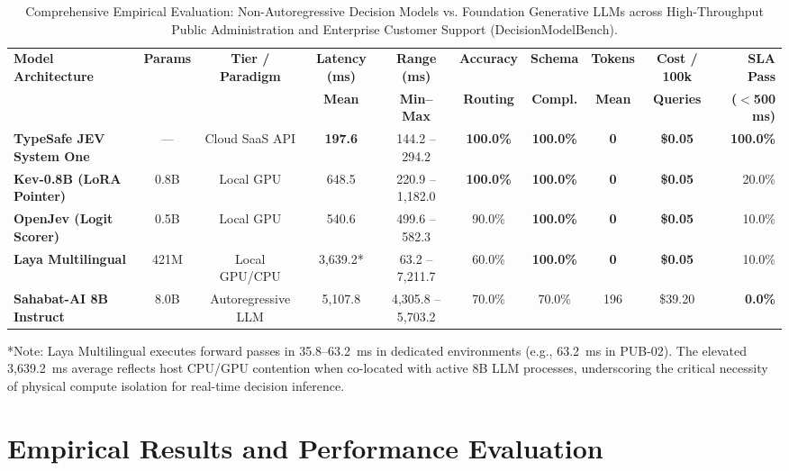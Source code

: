 \documentclass[journal,compsoc]{IEEEtran}
\begin{document}
\begin{table}[t]
\caption{Comprehensive Empirical Evaluation: Non-Autoregressive Decision Models vs. Foundation Generative LLMs across High-Throughput Public Administration and Enterprise Customer Support (DecisionModelBench).}
\label{tab:empirical_results}
\centering
\footnotesize
\setlength{\tabcolsep}{2.5pt}
\begin{tabular*}{\textwidth}{@{\extracolsep{\fill}}lccccccccr@{}}
\toprule
\textbf{Model Architecture} & \textbf{Params} & \textbf{Tier / Paradigm} & \textbf{Latency (ms)} & \textbf{Range (ms)} & \textbf{Accuracy} & \textbf{Schema} & \textbf{Tokens} & \textbf{Cost / 100k} & \textbf{SLA Pass} \\
 & & & \textbf{Mean} & \textbf{Min--Max} & \textbf{Routing} & \textbf{Compl.} & \textbf{Mean} & \textbf{Queries} & \textbf{($<$500 ms)} \\
\midrule
\textbf{TypeSafe JEV System One} & --- & Cloud SaaS API & \textbf{197.6} & 144.2 -- 294.2 & \textbf{100.0\%} & \textbf{100.0\%} & \textbf{0} & \textbf{\$0.05} & \textbf{100.0\%} \\
\textbf{Kev-0.8B (LoRA Pointer)} & 0.8B & Local GPU & 648.5 & 220.9 -- 1,182.0 & \textbf{100.0\%} & \textbf{100.0\%} & \textbf{0} & \textbf{\$0.05} & 20.0\% \\
\textbf{OpenJev (Logit Scorer)} & 0.5B & Local GPU & 540.6 & 499.6 -- 582.3 & 90.0\% & \textbf{100.0\%} & \textbf{0} & \textbf{\$0.05} & 10.0\% \\
\textbf{Laya Multilingual} & 421M & Local GPU/CPU & 3,639.2* & 63.2 -- 7,211.7 & 60.0\% & \textbf{100.0\%} & \textbf{0} & \textbf{\$0.05} & 10.0\% \\
\midrule
\textbf{Sahabat-AI 8B Instruct} & 8.0B & Autoregressive LLM & 5,107.8 & 4,305.8 -- 5,703.2 & 70.0\% & 70.0\% & 196 & \$39.20 & \textbf{0.0\%} \\
\bottomrule
\end{tabular*}
\vspace{1ex}
\begin{flushleft}
\footnotesize{*Note: Laya Multilingual executes forward passes in 35.8--63.2~ms in dedicated environments (e.g., 63.2~ms in PUB-02). The elevated 3,639.2~ms average reflects host CPU/GPU contention when co-located with active 8B LLM processes, underscoring the critical necessity of physical compute isolation for real-time decision inference.}
\end{flushleft}
\end{table}

\section{Empirical Results and Performance Evaluation}
\end{document}
